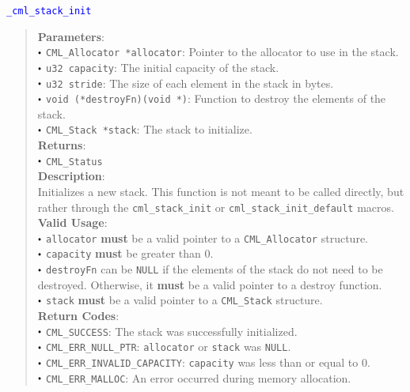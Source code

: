 \documentclass[a4paper,oneside,8pt]{extarticle}
\newcommand{\function}[1]{
  \noindent\textcolor{blue}{\texttt{#1}}
  \vspace{-0.3em}
}
\renewcommand{\dot}{\raisebox{0.3ex}{\scalebox{0.6}{$\bullet$}}}
\theoremstyle{definition}
\begin{document}
\function{\_cml\_stack\_init}
\begin{quote}
  \textbf{Parameters}: \\
  $\dot$ \texttt{CML\_Allocator *allocator}: Pointer to the allocator to use in the stack. \\
  $\dot$ \texttt{u32 capacity}: The initial capacity of the stack. \\
  $\dot$ \texttt{u32 stride}: The size of each element in the stack in bytes. \\
  $\dot$ \texttt{void (*destroyFn)(void *)}: Function to destroy the elements of the stack. \\
  $\dot$ \texttt{CML\_Stack *stack}: The stack to initialize. \\
  \textbf{Returns}: \\
  $\dot$ \texttt{CML\_Status} \\
  
  \vspace{-0.75em}
  \textbf{Description}: \\
  Initializes a new stack. This function is not meant to be called directly, but rather through the \texttt{cml\_stack\_init} or \texttt{cml\_stack\_init\_default} macros. \\

  \vspace{-0.75em}
  \textbf{Valid Usage}: \\
  $\dot$ \texttt{allocator} \textbf{must} be a valid pointer to a \texttt{CML\_Allocator} structure. \\
  $\dot$ \texttt{capacity} \textbf{must} be greater than 0. \\
  $\dot$ \texttt{destroyFn} can be \texttt{NULL} if the elements of the stack do not need to be destroyed. Otherwise, it \textbf{must} be a valid pointer to a destroy function. \\
  $\dot$ \texttt{stack} \textbf{must} be a valid pointer to a \texttt{CML\_Stack} structure. \\

  \vspace{-0.75em}
  \textbf{Return Codes}: \\
  $\dot$ \texttt{CML\_SUCCESS}: The stack was successfully initialized. \\
  $\dot$ \texttt{CML\_ERR\_NULL\_PTR}: \texttt{allocator} or \texttt{stack} was \texttt{NULL}. \\
  $\dot$ \texttt{CML\_ERR\_INVALID\_CAPACITY}: \texttt{capacity} was less than or equal to 0. \\
  $\dot$ \texttt{CML\_ERR\_MALLOC}: An error occurred during memory allocation. \\
\end{quote}
\end{document}
